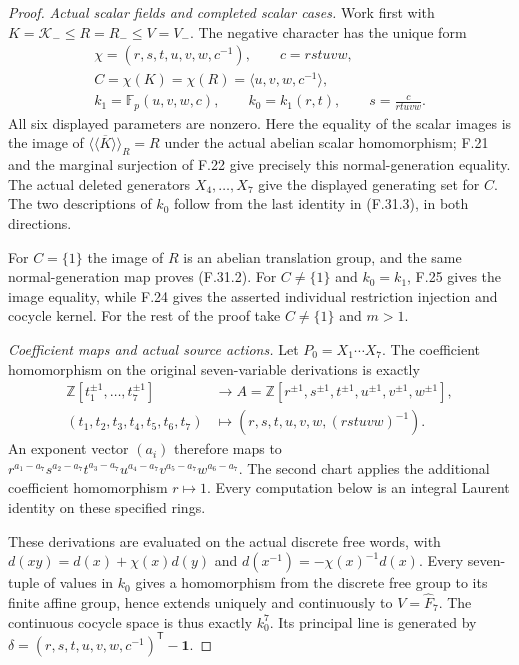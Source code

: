 \begin{proof}
\emph{Actual scalar fields and completed scalar cases.}
Work first with
$K=\mathcal K_-\leq R=R_-\leq V=V_-$.
The negative character has the unique form
\[
 \begin{gathered}
 \chi=(r,s,t,u,v,w,c^{-1}),\qquad c=rstuvw,\\
 C=\chi(K)=\chi(R)=\langle u,v,w,c^{-1}\rangle,\\
 k_1=\mathbb F_p(u,v,w,c),\qquad
 k_0=k_1(r,t),\qquad s=\frac{c}{rtuvw}.
 \end{gathered}                                                \tag{F.31.3}
\]
All six displayed parameters are nonzero.
Here the equality of the scalar images is
the image of
$\overline{\langle\!\langle K\rangle\!\rangle}_R=R$
under the actual abelian scalar homomorphism;
F.21 and the marginal surjection of F.22
give precisely this normal-generation equality.
The actual deleted generators $X_4,\ldots,X_7$
give the displayed generating set for $C$.
The two descriptions of $k_0$ follow from
the last identity in (F.31.3), in both directions.

For $C=\{1\}$ the image of $R$ is an
abelian translation group, and the same
normal-generation map proves (F.31.2).
For $C\ne\{1\}$ and $k_0=k_1$, F.25
gives the image equality, while F.24
gives the asserted individual restriction
injection and cocycle kernel.
For the rest of the proof take
$C\ne\{1\}$ and $m>1$.

\emph{Coefficient maps and actual source actions.}
Let $P_0=X_1\cdots X_7$.
The coefficient homomorphism on the original
seven-variable derivations is exactly
\[
 \begin{aligned}
 \mathbb Z[t_1^{\pm1},\ldots,t_7^{\pm1}]&\longrightarrow
 A=\mathbb Z[r^{\pm1},s^{\pm1},t^{\pm1},u^{\pm1},v^{\pm1},w^{\pm1}],\\
 (t_1,t_2,t_3,t_4,t_5,t_6,t_7)&\longmapsto
          (r,s,t,u,v,w,(rstuvw)^{-1}).
 \end{aligned}                                                \tag{F.31.4}
\]
An exponent vector $(a_i)$ therefore maps to
$r^{a_1-a_7}s^{a_2-a_7}t^{a_3-a_7}
 u^{a_4-a_7}v^{a_5-a_7}w^{a_6-a_7}$.
The second chart applies the additional
coefficient homomorphism $r\mapsto1$.
Every computation below is an integral
Laurent identity on these specified rings.

These derivations are evaluated on the actual
discrete free words, with
$d(xy)=d(x)+\chi(x)d(y)$ and
$d(x^{-1})=-\chi(x)^{-1}d(x)$.
Every seven-tuple of values in $k_0$ gives
a homomorphism from the discrete free group
to its finite affine group, hence extends
uniquely and continuously to $V=\widehat F_7$.
The continuous cocycle space is thus exactly
$k_0^7$.
Its principal line is generated by
$\delta=(r,s,t,u,v,w,c^{-1})^{\mathsf T}-\mathbf1$.


\end{proof}
